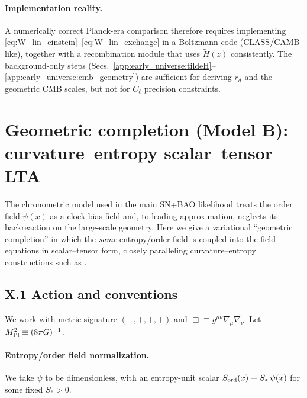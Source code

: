 \documentclass[10pt]{article}
\begin{document}
\paragraph{Implementation reality.}
A numerically correct Planck-era comparison therefore requires implementing
\eqref{eq:W_lin_einstein}--\eqref{eq:W_lin_exchange} in a Boltzmann code (CLASS/CAMB-like),
together with a recombination module that uses $\tilde H(z)$ consistently.
The background-only steps (Secs.~\ref{app:early_universe:tildeH}--\ref{app:early_universe:cmb_geometry})
are sufficient for deriving $r_d$ and the geometric CMB scales, but not for $C_\ell$ precision constraints.



\section{Geometric completion (Model B): curvature--entropy scalar--tensor LTA }
\label{app:geom_entropy}

The chronometric model used in the main SN+BAO likelihood treats the order field $\psi(x)$ as a
clock-bias field and, to leading approximation, neglects its backreaction on the large-scale geometry.
Here we give a variational ``geometric completion'' in which the \emph{same} entropy/order field
is coupled into the field equations in scalar--tensor form, closely paralleling curvature--entropy
constructions such as \cite{NeukartMarxVinokur2026ISL}.

\subsection{X.1 Action and conventions}
We work with metric signature $(-,+,+,+)$ and $\Box\equiv g^{\mu\nu}\nabla_\mu\nabla_\nu$.
Let $M_{\rm Pl}^2\equiv(8\pi G)^{-1}$.

\paragraph{Entropy/order field normalization.}
We take $\psi$ to be dimensionless, with an entropy-unit scalar
$S_{\rm ord}(x)\equiv S_\ast\,\psi(x)$ for some fixed $S_\ast>0$.
\end{document}
